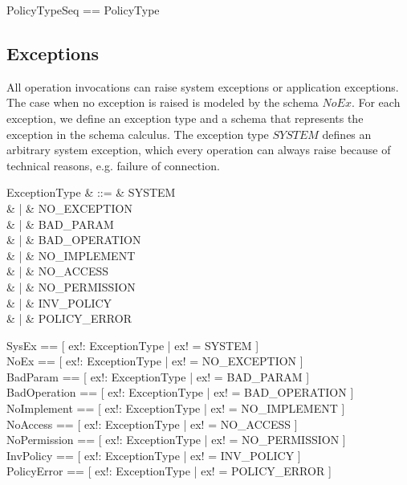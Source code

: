 \begin{zed}
  PolicyTypeSeq == \seq PolicyType
\end{zed}


\subsection{Exceptions} \label{sec:exceptions}

\vspace{2ex}

All operation invocations can raise system exceptions or application exceptions.
The case when no exception is raised is modeled by the schema $NoEx$.  For each
exception, we define an exception type and a schema that represents the
exception in the schema calculus.  The exception type $SYSTEM$ defines an
arbitrary system exception, which every operation can always raise because of
technical reasons, e.g. failure of connection.
\begin{syntax}
  ExceptionType & ::= & SYSTEM \\
  & | & NO\_EXCEPTION \\
  & | & BAD\_PARAM \\
  & | & BAD\_OPERATION \\
  & | & NO\_IMPLEMENT \\
  & | & NO\_ACCESS \\
  & | & NO\_PERMISSION \\
  & | & INV\_POLICY \\
  & | & POLICY\_ERROR \\
\end{syntax}

\begin{zed}
  SysEx == [ ex!: ExceptionType | ex! = SYSTEM ] \\
  NoEx == [ ex!: ExceptionType | ex! = NO\_EXCEPTION ] \\
  BadParam == [ ex!: ExceptionType | ex! = BAD\_PARAM ] \\
  BadOperation == [ ex!: ExceptionType | ex! = BAD\_OPERATION ] \\
  NoImplement == [ ex!: ExceptionType | ex! = NO\_IMPLEMENT ] \\
  NoAccess == [ ex!: ExceptionType | ex! = NO\_ACCESS ] \\
  NoPermission == [ ex!: ExceptionType | ex! = NO\_PERMISSION ] \\
  InvPolicy == [ ex!: ExceptionType | ex! = INV\_POLICY ] \\
  PolicyError == [ ex!: ExceptionType | ex! = POLICY\_ERROR ] \\
\end{zed}

